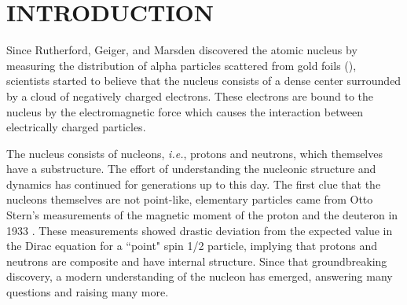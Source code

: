 





%
\chapter{INTRODUCTION}
\label{labint}
Since Rutherford, Geiger, and Marsden discovered the atomic nucleus by measuring the distribution of alpha particles scattered from gold foils (\cite{1,2,3}), scientists started to believe that the nucleus consists of a dense center surrounded by a cloud of negatively charged electrons. These electrons are bound to the nucleus by the electromagnetic force which causes the interaction between electrically charged particles.

The nucleus consists of nucleons, \emph{i.e.}, protons and neutrons, which themselves have a substructure. The effort of understanding the nucleonic structure and dynamics has continued for generations up to this day. The first clue that the nucleons themselves are not point-like, elementary particles came from Otto Stern's measurements of the magnetic moment of the proton and the deuteron in 1933 \cite{4}. These measurements showed drastic deviation from the expected value in the Dirac equation for a ``point" spin 1/2 particle, implying that protons and neutrons are composite and have internal structure. Since that groundbreaking discovery, a modern understanding of the nucleon has emerged, answering many questions and raising many more.

